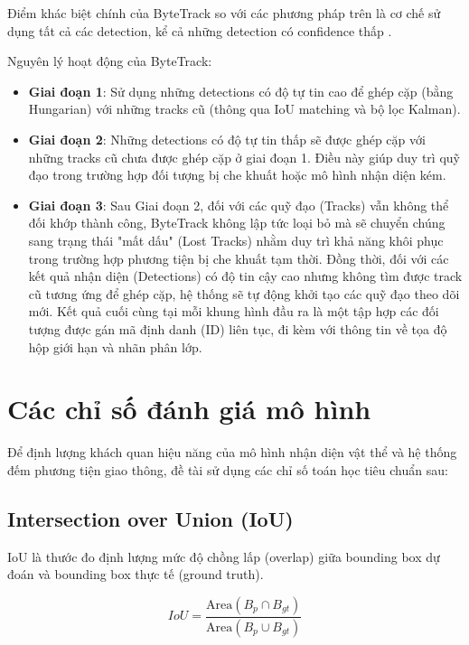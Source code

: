 Điểm khác biệt chính của ByteTrack so với các phương pháp trên là cơ chế sử dụng tất cả các detection, kể cả những detection có confidence thấp \cite{bytetrack}.

Nguyên lý hoạt động của ByteTrack:
\begin{itemize}
	\item \textbf{Giai đoạn 1}: Sử dụng những detections có độ tự tin cao để ghép cặp (bằng Hungarian) với những tracks cũ (thông qua IoU matching và bộ lọc Kalman).
	
	\item \textbf{Giai đoạn 2}: Những detections có độ tự tin thấp sẽ được ghép cặp với những tracks cũ chưa được ghép cặp ở giai đoạn 1. Điều này giúp duy trì quỹ đạo trong trường hợp đối tượng bị che khuất hoặc mô hình nhận diện kém.
	
	\item \textbf{Giai đoạn 3}: Sau Giai đoạn 2, đối với các quỹ đạo (Tracks) vẫn không thể đối khớp thành công, ByteTrack không lập tức loại bỏ mà sẽ chuyển chúng sang trạng thái "mất dấu" (Lost Tracks) nhằm duy trì khả năng khôi phục trong trường hợp phương tiện bị che khuất tạm thời. Đồng thời, đối với các kết quả nhận diện (Detections) có độ tin cậy cao nhưng không tìm được track cũ tương ứng để ghép cặp, hệ thống sẽ tự động khởi tạo các quỹ đạo theo dõi mới. Kết quả cuối cùng tại mỗi khung hình đầu ra là một tập hợp các đối tượng được gán mã định danh (ID) liên tục, đi kèm với thông tin về tọa độ hộp giới hạn và nhãn phân lớp.
\end{itemize}

\section{Các chỉ số đánh giá mô hình}

Để định lượng khách quan hiệu năng của mô hình nhận diện vật thể và hệ thống đếm phương tiện giao thông, đề tài sử dụng các chỉ số toán học tiêu chuẩn sau:

\subsection{Intersection over Union (IoU)}

IoU là thước đo định lượng mức độ chồng lấp (overlap) giữa bounding box dự đoán và bounding box thực tế (ground truth).

\begin{equation}
	IoU = \frac{\text{Area}(B_p \cap B_{gt})}{\text{Area}(B_p \cup B_{gt})}
\end{equation}

